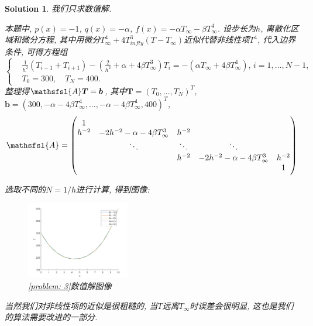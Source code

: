 \documentclass[a4paper, 12pt]{ctexart}
\theoremstyle{plain}
\theoremstyle{plain}
\theoremstyle{plain}
\theoremstyle{nonumberplain}
\newtheorem{solution}{Solution}
\newcommand*{\matr}[1]{\ensuremath{\mathsfsl{#1}}} %
\newcommand*{\vect}[1]{\bm{#1}}
\begin{document}
    \begin{solution}
        我们只求数值解.

        本题中, $p(x)=-1$, $q(x)=-\alpha$, $f(x)=-\alpha T_{\infty}-\beta T_{\infty}^{4}$. 设步长为$h$, 离散化区域和微分方程, 其中用微分$T_{\infty}^{4}+4T_{infty}^{3}(T-T_{\infty})$近似代替非线性项$T^{4}$, 代入边界条件, 可得方程组
        \begin{equation}
            \left\{
            \begin{aligned}
                &\frac{1}{h^{2}}(T_{i-1}+T_{i+1})-\left(\frac{2}{h^{2}}+\alpha+4\beta T_{\infty}^{3}\right)T_{i}=-(\alpha T_{\infty}+4\beta T_{\infty}^{4}),\,i=1,\dotsc,N-1,\\
                &T_{0}=300,\quad T_{N}=400.
            \end{aligned}
            \right.
        \end{equation}
        整理得$\matr{A}\vect{T}=\vect{b}$, 其中$\vect{T}=(T_{0},\dotsc,T_{N})^{T}$, $\vect{b}=(300, -\alpha-4\beta T_{\infty}^{4}, \dotsc, -\alpha-4\beta T_{\infty}^{4}, 400)^{T}$,
        \begin{equation}
            \matr{A}=
            \begin{pmatrix}
                1\\
                h^{-2} & -2h^{-2}-\alpha-4\beta T_{\infty}^{3} & h^{-2}\\
                & \ddots & \ddots & \ddots\\
                & & h^{-2} & -2h^{-2}-\alpha-4\beta T_{\infty}^{3} & h^{-2}\\
                & & & & 1
            \end{pmatrix}
        \end{equation}

        选取不同的$N=1/h$进行计算, 得到图像:
        \begin{figure}[H]
            \centering
            \includegraphics[width=0.4\textwidth]{wc31.png}
            \caption{\ref{problem: 3}数值解图像}
       \end{figure}

       当然我们对非线性项的近似是很粗糙的, 当$T$远离$T_{\infty}$时误差会很明显, 这也是我们的算法需要改进的一部分.
    \end{solution}
\end{document}
